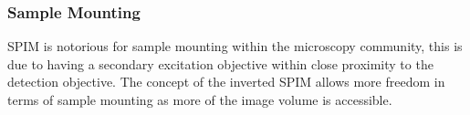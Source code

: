 




\subsubsection{Sample Mounting}

SPIM is notorious for sample mounting within the microscopy community, this is due to having a secondary excitation objective within close proximity to the detection objective.
The concept of the inverted SPIM \cite{Wu2011} allows more freedom in terms of sample mounting as more of the image volume is accessible.

